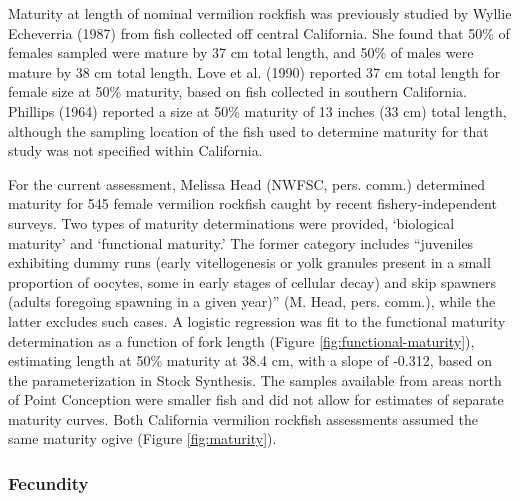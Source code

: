 \documentclass[11pt,
  english,
]{article}
\begin{document}
\leavevmode\tagmcend\tagstructend

Maturity at length of nominal vermilion rockfish was previously studied by Wyllie Echeverria {(1987)\leavevmode\tagmcend\tagstructend} from fish collected off central California. She found that 50\% of females sampled were mature by 37 cm total length, and 50\% of males were mature by 38 cm total length. Love et al. {(1990)\leavevmode\tagmcend\tagstructend} reported 37 cm total length for female size at 50\% maturity, based on fish collected in southern California. Phillips {(1964)\leavevmode\tagmcend\tagstructend} reported a size at 50\% maturity of 13 inches (33 cm) total length, although the sampling location of the fish used to determine maturity for that study was not specified within California.

For the current assessment, Melissa Head (NWFSC, pers. comm.) determined maturity for 545 female vermilion rockfish caught by recent fishery-independent surveys. Two types of maturity determinations were provided, `biological maturity' and `functional maturity.' The former category includes ``juveniles exhibiting dummy runs (early vitellogenesis or yolk granules present in a small proportion of oocytes, some in early stages of cellular decay) and skip spawners (adults foregoing spawning in a given year)'' (M. Head, pers. comm.), while the latter excludes such cases. A logistic regression was fit to the functional maturity determination as a function of fork length (Figure \ref{fig:functional-maturity}), estimating length at 50\% maturity at 38.4 cm, with a slope of -0.312, based on the parameterization in Stock Synthesis. The samples available from areas north of Point Conception were smaller fish and did not allow for estimates of separate maturity curves. Both California vermilion rockfish assessments assumed the same maturity ogive (Figure \ref{fig:maturity}).


\hypertarget{fecundity}{%
\subsubsection{Fecundity}\label{fecundity}}

\leavevmode\tagmcend\tagstructend
\end{document}
